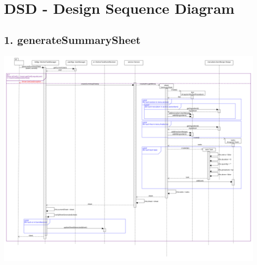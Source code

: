 \chapter{DSD - Design Sequence Diagram}

\section*{1. generateSummarySheet}

\begin{center}
  \includegraphics[scale = 0.22]{images/DSD/DSD 1.png}
\end{center}
